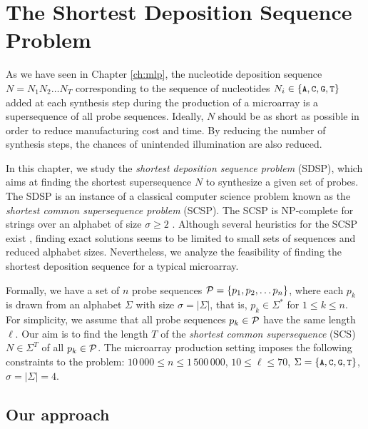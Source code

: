 \chapter{The Shortest Deposition Sequence Problem}
\label{ch:scs}

As we have seen in Chapter \ref{ch:mlp}, the nucleotide deposition sequence
$N = N_{1} N_{2} \ldots N_{T}$ corresponding to the sequence of nucleotides
$N_i \in \{\text{\small{\tt A}}, \text{\small{\tt C}}, \text{\small{\tt G}}, \text{\small{\tt T}}\}$ added at each synthesis step during the
production of a microarray is a supersequence of all probe sequences. Ideally,
$N$ should be as short as possible in order to reduce manufacturing cost and
time. By reducing the number of synthesis steps, the chances of unintended
illumination are also reduced.

In this chapter, we study the \emph{shortest deposition sequence problem}
(SDSP), which aims at finding the shortest supersequence $N$ to synthesize a
given set of probes. The SDSP is an instance of a classical computer science
problem known as the \emph{shortest common supersequence problem} (SCSP). The
SCSP is NP-complete for strings over an alphabet of size $\sigma \geq 2$
\citep{Raiha1981}. Although several heuristics for the SCSP exist
\citep[for a survey, see][]{Fraser1995}, finding exact solutions seems to be
limited to small sets of sequences and reduced alphabet sizes. Nevertheless, we
analyze the feasibility of finding the shortest deposition sequence for a
typical microarray.

Formally, we have a set of $n$ probe sequences
${\mathcal{P}} = \{p_1, p_2, \ldots p_n \}$, where each $p_k$ is drawn from an alphabet
$\Sigma$ with size $\sigma = | \Sigma |$, that is, $p_k \in \Sigma^{\ast}$ for
$1 \leq k \leq n$. For simplicity, we assume that all probe sequences
$p_k \in {\mathcal{P}}$ have the same length $\ell$. Our aim is to find the length $T$
of the \emph{shortest common supersequence} (SCS) $N \in \Sigma^T$ of all
$p_k \in {\mathcal{P}}$. The microarray production setting imposes the following
constraints to the problem: $10\,000 \leq n \leq 1\,500\,000$,
$10 \leq \ell \leq 70$, $\Sigma = \{\text{\small{\tt A}},\text{\small{\tt C}},\text{\small{\tt G}},\text{\small{\tt T}}\}$,
$\sigma = | \Sigma | = 4$.

\section{Our approach}
\label{sec:scs_ourapproach}

